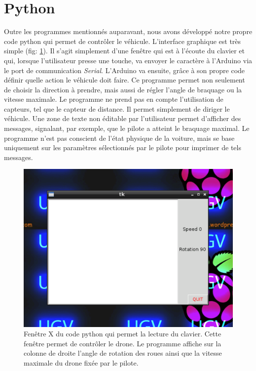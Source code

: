 \documentclass[a4paper,11pt]{report}
\begin{document}
{\section{Python}
Outre les programmes mentionnés auparavant, nous avons développé notre propre
code python qui permet de contrôler le
véhicule. L'interface graphique est très simple
(fig: \ref{pythonenvironnement}). Il s'agit simplement d'une fenêtre qui est à
l'écoute du clavier et qui, lorsque l'utilisateur presse une touche, va
envoyer le caractère à l'Arduino via le port de communication
\textit{Serial}. L'Arduino va ensuite, grâce à son propre code définir quelle action le
véhicule doit faire. Ce programme permet non seulement de choisir la direction
à prendre, mais aussi de régler l'angle de braquage ou la vitesse maximale. Le programme ne prend pas en
compte l'utilisation de capteurs, tel que le capteur de distance. Il permet
simplement de diriger le véhicule. Une zone de texte non éditable par
l'utilisateur permet d'afficher des messages, signalant, par exemple, que le
pilote a atteint le braquage maximal. Le programme n'est pas conscient de
l'état physique de la voiture, mais se base uniquement sur les paramètres
sélectionnés par le pilote pour imprimer de tels messages. 

\begin{center}
\begin{figure}[!h]
\includegraphics[scale=1]{python-environnement}
\caption[Interface graphique Python]{Fenêtre X du code python qui permet la lecture du clavier. Cette fenêtre permet de contrôler le drone. Le programme affiche sur la colonne de droite l'angle de rotation des roues ainsi que la vitesse maximale du drone fixée par le pilote.\label{pythonenvironnement}}
\end{figure}
\end{center}


}
\end{document}
